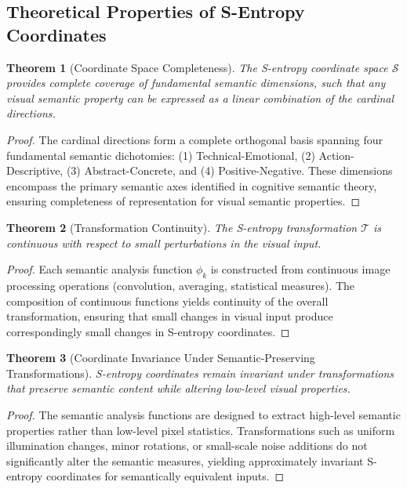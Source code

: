 \documentclass[11pt,a4paper]{article}
\newtheorem{theorem}{Theorem}[section]
\begin{document}
\subsection{Theoretical Properties of S-Entropy Coordinates}

\begin{theorem}[Coordinate Space Completeness]
The S-entropy coordinate space $\mathcal{S}$ provides complete coverage of fundamental semantic dimensions, such that any visual semantic property can be expressed as a linear combination of the cardinal directions.
\end{theorem}

\begin{proof}
The cardinal directions form a complete orthogonal basis spanning four fundamental semantic dichotomies: (1) Technical-Emotional, (2) Action-Descriptive, (3) Abstract-Concrete, and (4) Positive-Negative. These dimensions encompass the primary semantic axes identified in cognitive semantic theory, ensuring completeness of representation for visual semantic properties.
\end{proof}

\begin{theorem}[Transformation Continuity]
The S-entropy transformation $\mathcal{T}$ is continuous with respect to small perturbations in the visual input.
\end{theorem}

\begin{proof}
Each semantic analysis function $\phi_k$ is constructed from continuous image processing operations (convolution, averaging, statistical measures). The composition of continuous functions yields continuity of the overall transformation, ensuring that small changes in visual input produce correspondingly small changes in S-entropy coordinates.
\end{proof}

\begin{theorem}[Coordinate Invariance Under Semantic-Preserving Transformations]
S-entropy coordinates remain invariant under transformations that preserve semantic content while altering low-level visual properties.
\end{theorem}

\begin{proof}
The semantic analysis functions are designed to extract high-level semantic properties rather than low-level pixel statistics. Transformations such as uniform illumination changes, minor rotations, or small-scale noise additions do not significantly alter the semantic measures, yielding approximately invariant S-entropy coordinates for semantically equivalent inputs.
\end{proof}
\end{document}
